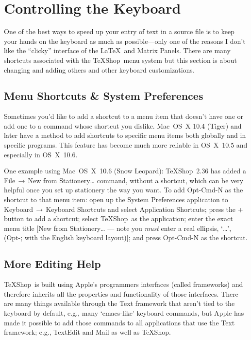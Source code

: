 \documentclass[letterpaper,11pt]{article}
\newcommand{\TS}{\textsf{\TeX Shop}}
\newcommand{\cmd}[1]{\textsf{#1}}
\newcommand{\mnu}[1]{\textsf{#1}}
\newcommand{\To}{\,\(\to\)\,}
\begin{document}
\section{Controlling the Keyboard}

One of the best ways to speed up your entry of text in a source file is to keep your hands on the keyboard as much as possible---only one of the reasons I don't like the ``clicky'' interface of the \LaTeX\ and Matrix Panels. There are many shortcuts associated with the \TS\ menu system but this section is about changing and adding others and other keyboard customizations.

\subsection{Menu Shortcuts \& System Preferences}

Sometimes you'd like to add a shortcut to a menu item that doesn't have one or add one to a command whose shortcut you dislike. Mac~OS~X 10.4 (Tiger) and later have a method to add shortcuts to specific menu items both globally and in specific programs. This feature has become much more reliable in OS~X~10.5 and especially in OS~X~10.6.

One example using Mac~OS~X~10.6 (Snow Leopard): \TS\ 2.36 has added a \mnu{File}\To\mnu{New from Stationery…} command, without a shortcut, which can be very helpful once you set up stationery the way you want. To add \cmd{Opt-Cmd-N} as the shortcut to that menu item: open up the \textsf{System Preferences} application to \mnu{Keyboard}\To\mnu{Keyboard Shortcuts} and select \mnu{Application Shortcuts}; press the \mnu{+} button to add a shortcut; select \TS\ as the application; enter the exact menu title [\mnu{New from Stationery…} --- note you \emph{must} enter a real ellipsis, `…', (\cmd{Opt-;} with the English keyboard layout)]; and press \cmd{Opt-Cmd-N} as the shortcut.

\subsection{More Editing Help}

\TS\ is built using Apple's programmers interfaces (called frameworks) and therefore inherits all the properties and functionality of those interfaces. There are many things available through the Text framework that aren't tied to the keyboard by default, e.g., many `\cmd{emacs}-like' keyboard commands, but Apple has made it possible to add those commands to all applications that use the Text framework; e.g., \textsf{TextEdit} and \textsf{Mail} as well as \TS.
\end{document}
